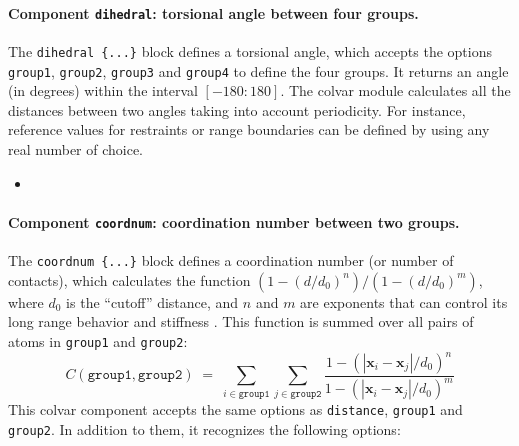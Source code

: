 \paragraph*{Component \texttt{dihedral}: torsional angle between four groups.}
The \texttt{dihedral~\{...\}} block defines a torsional angle, which
accepts the options \texttt{group1}, \texttt{group2}, \texttt{group3}
and \texttt{group4} to define the four groups.  It returns an angle
(in degrees) within the interval $[-180:180]$.  The colvar module
calculates all the distances between two angles taking into account
periodicity.  For instance, reference values for restraints or range
boundaries can be defined by using any real number of choice.
\begin{itemize}
\item  {}
\end{itemize}


\paragraph*{Component \texttt{coordnum}: coordination number
  between two groups.}  The \texttt{coordnum \{...\}} block defines
a coordination number (or number of contacts), which calculates the
function $(1-(d/d_0)^{n})/(1-(d/d_0)^{m})$, where $d_0$ is the
``cutoff'' distance, and $n$ and $m$ are exponents that can control
its long range behavior and stiffness \cite{Iannuzzi2003}.  This
function is summed over all pairs of atoms in \texttt{group1} and
\texttt{group2}:
\begin{equation}
  \label{eq:cvc_coordnum}
  C (\mathtt{group1}, \mathtt{group2}) \; = \; 
  \sum_{i\in\mathtt{group1}}\sum_{j\in\mathtt{group2}} {
    \frac{1 - (|\mathbf{x}_{i}-\mathbf{x}_{j}|/d_{0})^{n}}{
      1 - (|\mathbf{x}_{i}-\mathbf{x}_{j}|/d_{0})^{m} }
  }
\end{equation}
This colvar component accepts the same options as \texttt{distance},
\texttt{group1} and \texttt{group2}.  In addition to them, it
recognizes the following options:

